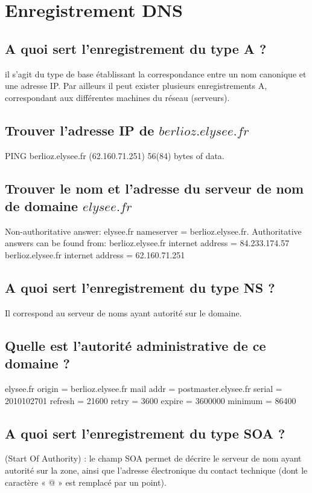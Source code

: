 \chapter{Enregistrement DNS}

\section{A quoi sert l'enregistrement du type A ?}
il s'agit du type de base établissant la correspondance entre un nom canonique et une adresse IP. Par ailleurs il peut exister plusieurs enregistrements A, correspondant aux différentes machines du réseau (serveurs). 
\section{Trouver l'adresse IP de $berlioz.elysee.fr$}
PING berlioz.elysee.fr (62.160.71.251) 56(84) bytes of data. 

\section{Trouver le nom et l'adresse du serveur de nom de domaine $elysee.fr$}
Non-authoritative answer: 
elysee.fr	nameserver = berlioz.elysee.fr. 
Authoritative answers can be found from: 
berlioz.elysee.fr	internet address = 84.233.174.57 
berlioz.elysee.fr	internet address = 62.160.71.251 

\section{A quoi sert l'enregistrement du type NS ?}
Il correspond au serveur de noms ayant autorité sur le domaine. 

\section{Quelle est l'autorité administrative de ce domaine ?}
elysee.fr 
	origin = berlioz.elysee.fr 
	mail addr = postmaster.elysee.fr 
	serial = 2010102701 
	refresh = 21600 
	retry = 3600 
	expire = 3600000 
	minimum = 86400 	

\section{A quoi sert l'enregistrement du type SOA ?}
(Start Of Authority) : le champ SOA permet de décrire le serveur de nom ayant autorité sur la zone, ainsi que l'adresse électronique du contact technique (dont le caractère « @ » est remplacé par un point). 

